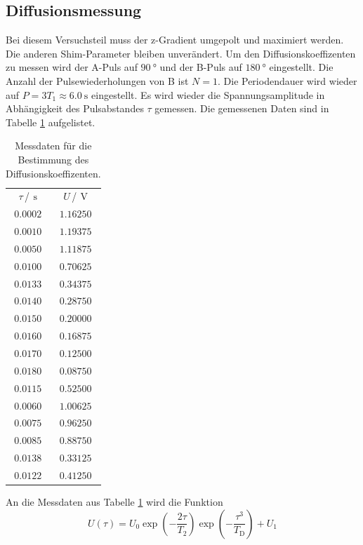 \subsection{Diffusionsmessung}
Bei diesem Versuchsteil muss der z-Gradient umgepolt und maximiert werden. Die anderen Shim-Parameter bleiben unverändert. 
Um den Diffusionskoeffizenten zu messen wird der A-Puls auf $\SI{90}{\degree}$ und der B-Puls auf $\SI{180}{\degree}$ eingestellt.
Die Anzahl der Pulsewiederholungen von B ist $N=1$. Die Periodendauer wird wieder auf $P=3T_{\text{1}}\approx \SI{6.0}{\second}$ 
eingestellt.
Es wird wieder die Spannungsamplitude in Abhängigkeit des Pulsabstandes $\tau$ gemessen.
Die gemessenen Daten sind in Tabelle \ref{tab:Diff_messung} aufgelistet. 
\begin{table}
  \centering
  \caption{Messdaten für die Bestimmung des Diffusionskoeffizenten.}
  \label{tab:Diff_messung}
  \begin{tabular}{c c}
    \toprule
    $\tau$\,/\,$\SI{}{\second}$&$U$\,/\,$\SI{}{\volt}$\\
    $\num{0.0002}$&$\num{1.16250}$\\
    $\num{0.0010}$&$\num{1.19375}$\\
    $\num{0.0050}$&$\num{1.11875}$\\
    $\num{0.0100}$&$\num{0.70625}$\\
    $\num{0.0133}$&$\num{0.34375}$\\
    $\num{0.0140}$&$\num{0.28750}$\\
    $\num{0.0150}$&$\num{0.20000}$\\
    $\num{0.0160}$&$\num{0.16875}$\\
    $\num{0.0170}$&$\num{0.12500}$\\
    $\num{0.0180}$&$\num{0.08750}$\\
    $\num{0.0115}$&$\num{0.52500}$\\
    $\num{0.0060}$&$\num{1.00625}$\\
    $\num{0.0075}$&$\num{0.96250}$\\
    $\num{0.0085}$&$\num{0.88750}$\\
    $\num{0.0138}$&$\num{0.33125}$\\
    $\num{0.0122}$&$\num{0.41250}$\\
    \bottomrule
  \end{tabular}
\end{table}
An die Messdaten aus Tabelle \ref{tab:Diff_messung} wird die Funktion
\begin{equation}
  U(\tau)=U_{\text{0}} \exp{\left(-\frac{2\tau}{T_{\text{2}}}\right)}\exp{\left(-\frac{\tau^3}{T_{\text{D}}}\right)}+U_{\text{1}}
\end{equation}
